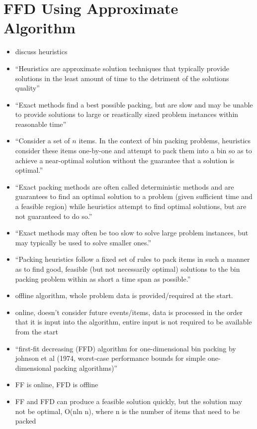 \documentclass[oribibl]{llncs}
\begin{document}
\section{FFD Using Approximate Algorithm}
\label{sec:ffdapprox}
\begin{itemize}
	\item discuss heuristics
	\item ``Heuristics are approximate solution techniques that typically provide solutions in the least amount of time to the detriment of the solutions quality''
	\item ``Exact methods find a best possible packing, but are slow and may be unable to provide solutions to large or reastically sized problem instances within reasonable time''
	\item ``Consider a set of $n$ items. In the context of bin packing problems, heuristics consider these items one-by-one and attempt to pack them into a bin so as to achieve a near-optimal solution without the guarantee that a solution is optimal.''
	\item ``Exact packing methods are often called deterministic methods and are guarantees to find an optimal solution to a problem (given sufficient time and a feasible region) while heuristics attempt to find optimal solutions, but are not guaranteed to do so.''
	\item ``Exact methods may often be too slow to solve large problem instances, but may typically be used to solve smaller ones.''
	\item ``Packing heuristics follow a fixed set of rules to pack items in such a manner as to find good, feasible (but not necessarily optimal) solutions to the bin packing problem within as short a time span as possible.''
	\item offline algorithm, whole problem data is provided/required at the start.
	\item online, doesn't consider future events/items, data is processed in the order that it is input into the algorithm, entire input is not required to be available from the start
	\item ``first-fit decreasing (FFD) algorithm for one-dimensional bin packing by johnson et al (1974, worst-case performance bounds for simple one-dimensional packing algorithms)''
	\item FF is online, FFD is offline
	\item FF and FFD can produce a feasible solution quickly, but the solution may not be optimal, O(nln n), where n is the number of items that need to be packed

\end{itemize}
\end{document}
